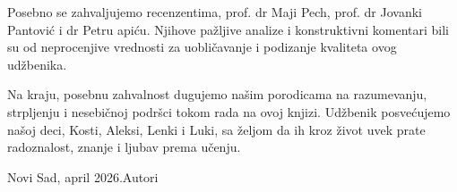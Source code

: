 \noindent

Posebno se zahvaljujemo recenzentima, prof. dr Maji Pech, prof. dr Jovanki Pantovi\' c i dr Petru \Dj api\' cu. Njihove pa\v zljive analize i konstruktivni komentari bili su od neprocenjive vrednosti za uobli\v cavanje i podizanje kvaliteta ovog ud\v zbenika.

Na kraju, posebnu zahvalnost dugujemo našim porodicama na razumevanju, strpljenju i nesebičnoj podršci tokom rada na ovoj knjizi. Udžbenik posvećujemo našoj deci, Kosti, Aleksi, Lenki i Luki, sa željom da ih kroz život uvek prate radoznalost, znanje i ljubav prema učenju.

\vspace*{1.5cm}


\noindent
Novi Sad, april 2026.\hfill Autori\newline